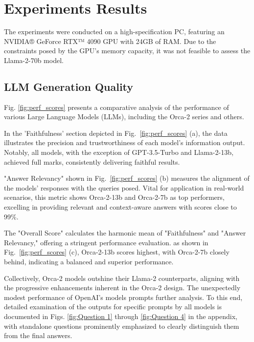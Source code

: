 \documentclass[runningheads]{llncs}
\begin{document}
\section{Experiments Results}
\label{sec:Results}

The experiments were conducted on a high-specification PC, featuring an NVIDIA® GeForce RTX™ 4090 GPU with 24GB of RAM. Due to the constraints posed by the GPU's memory capacity, it was not feasible to assess the Llama-2-70b model.

\subsection{LLM Generation Quality}
Fig. \ref{fig:perf_scores} presents a comparative analysis of the performance of various Large Language Models (LLMs), including the Orca-2 series and others.

In the 'Faithfulness' section depicted in Fig.~\ref{fig:perf_scores} (a), the data illustrates the precision and trustworthiness of each model's information output. Notably, all models, with the exception of GPT-3.5-Turbo and Llama-2-13b, achieved full marks, consistently delivering faithful results.

"Answer Relevancy" shown in  Fig.~\ref{fig:perf_scores} (b) measures the alignment of the models' responses with the queries posed. Vital for application in real-world scenarios, this metric shows Orca-2-13b and Orca-2-7b as top performers, excelling in providing relevant and context-aware answers with scores close to 99\%.

The "Overall Score" calculates the harmonic mean of "Faithfulness" and "Answer Relevancy," offering a stringent performance evaluation. as shown in   Fig.~\ref{fig:perf_scores} (c), Orca-2-13b scores highest, with Orca-2-7b closely behind, indicating a balanced and superior performance.

Collectively, Orca-2 models outshine their Llama-2 counterparts, aligning with the progressive enhancements inherent in the Orca-2 design. The unexpectedly modest performance of OpenAI's models prompts further analysis. To this end, detailed examination of the outputs for specific prompts by all models is documented in Figs. \ref{fig:Question 1} through \ref{fig:Question 4} in the appendix, with standalone questions prominently emphasized to clearly distinguish them from the final answers.
\end{document}
